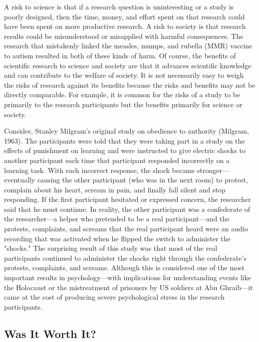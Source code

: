 A risk to science is that if a research question is uninteresting or a study is poorly designed, then the time, money, and effort spent on that research could have been spent on more productive research. A risk to society is that research results could be misunderstood or misapplied with harmful consequences. The research that mistakenly linked the measles, mumps, and rubella (MMR) vaccine to autism resulted in both of these kinds of harm. Of course, the benefits of scientific research to science and society are that it advances scientific knowledge and can contribute to the welfare of society.
It is not necessarily easy to weigh the risks of research against its benefits because the risks and benefits may not be directly comparable. For example, it is common for the risks of a study to be primarily to the research participants but the benefits primarily for science or society. 


Consider, Stanley Milgram's original study on obedience to authority (Milgram, 1963). The participants were told that they were taking part in a study on the effects of punishment on learning and were instructed to give electric shocks to another participant each time that participant responded incorrectly on a learning task. With each incorrect response, the shock became stronger---eventually causing the other participant (who was in the next room) to protest, complain about his heart, scream in pain, and finally fall silent and stop responding. If the first participant hesitated or expressed concern, the researcher said that he must continue. In reality, the other participant was a confederate of the researcher---a helper who pretended to be a real participant---and the protests, complaints, and screams that the real participant heard were an audio recording that was activated when he flipped the switch to administer the "shocks." The surprising result of this study was that most of the real participants continued to administer the shocks right through the confederate's protests, complaints, and screams. Although this is considered one of the most important results in psychology---with implications for understanding events like the Holocaust or the mistreatment of prisoners by US soldiers at Abu Ghraib---it came at the cost of producing severe psychological stress in the research participants.


\subsection{Was It Worth It?}


